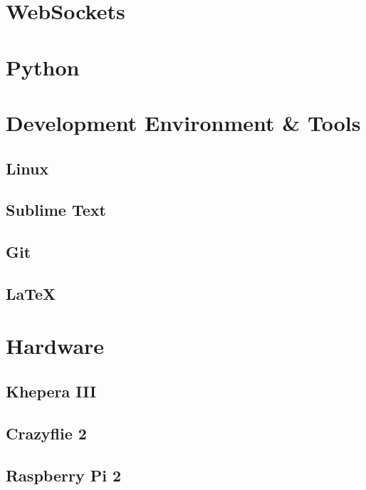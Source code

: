 \section{WebSockets}
\section{Python}
\section{Development Environment \& Tools}
\subsection{Linux}
\subsection{Sublime Text}
\subsection{Git}
\subsection{\LaTeX}
\section{Hardware}
\subsection{Khepera III}
\subsection{Crazyflie 2}
\subsection{Raspberry Pi 2}
